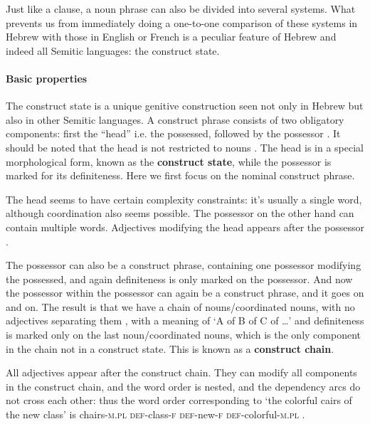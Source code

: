 \documentclass[a4paper, oneside, 12pt]{report}
\newcommand*{\citepage}[1]{p.~{#1}}
\newcommand*{\concept}[1]{\textbf{#1}}
\newcommand{\category}[1]{\textsc{#1}}
\newcommand{\translate}[1]{`#1'}
\begin{document}
Just like a clause, a noun phrase can also be divided into several systems.
What prevents us from immediately doing a one-to-one comparison of these systems in Hebrew
with those in English or French 
is a peculiar feature of Hebrew and indeed all Semitic languages:
the construct state.

\paragraph*{Basic properties}

The construct state is a unique genitive construction seen not only in Hebrew
but also in other Semitic languages.
A construct phrase consists of two obligatory components:
first the ``head'' i.e. the possessed,
followed by the possessor \citep[\citepage{26}]{glinert2004grammar}.
It should be noted that the head is not restricted to nouns
\citep[\citepage{25}]{glinert2004grammar}. 
The head is in a special morphological form,
known as the \concept{construct state},
while the possessor is marked for its definiteness.
Here we first focus on the nominal construct phrase.

The head seems to have certain complexity constraints:
it's usually a single word, although coordination also seems possible.
The possessor on the other hand can contain multiple words.
Adjectives modifying the head appears after the possessor
\citep[\citepage{25}]{glinert2004grammar}.

The possessor can also be a construct phrase,
containing one possessor modifying the possessed,
and again definiteness is only marked on the possessor.
And now the possessor within the possessor can again be a construct phrase,
and it goes on and on.
The result is that we have a chain of nouns/coordinated nouns,
with no adjectives separating them \citep{borer1999deconstructing},
with a meaning of \translate{A of B of C of \dots}
and definiteness is marked only on the last noun/coordinated nouns,
which is the only component in the chain not in a construct state.
This is known as a \concept{construct chain}.

All adjectives appear after the construct chain.
They can modify all components in the construct chain,
and the word order is nested,
and the dependency arcs do not cross each other:
thus the word order corresponding to \translate{the colorful cairs of the new class}
is chairs-\category{m.pl} \category{def}-class-\category{f} \category{def}-new-\category{f} \category{def}-colorful-\category{m.pl}
\citep{borer1999deconstructing}.
\end{document}
